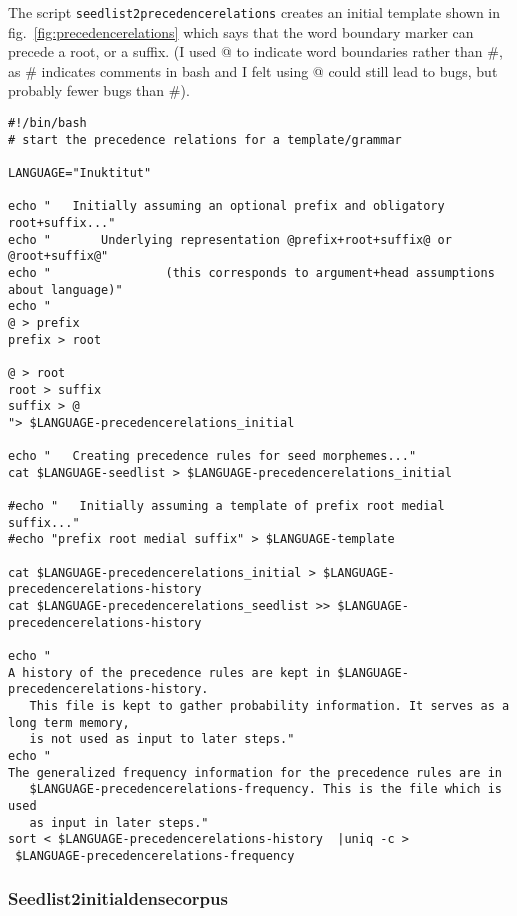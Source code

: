 \documentclass[runningheads,a4paper]{llncs}
\begin{document}
The script {\tt seedlist2precedencerelations} creates an initial template shown in fig.~\ref{fig:precedencerelations} which says that the word boundary marker can precede a root, or a suffix. (I used @ to indicate word boundaries rather than \#, as \# indicates comments in bash and I felt using @ could still lead to bugs, but probably fewer bugs than \#). 

\begin{figure*}[p]
\begin{verbatim}
#!/bin/bash
# start the precedence relations for a template/grammar

LANGUAGE="Inuktitut"

echo "   Initially assuming an optional prefix and obligatory root+suffix..."
echo "       Underlying representation @prefix+root+suffix@ or @root+suffix@"
echo "                (this corresponds to argument+head assumptions about language)"
echo "
@ > prefix
prefix > root

@ > root
root > suffix
suffix > @
"> $LANGUAGE-precedencerelations_initial

echo "   Creating precedence rules for seed morphemes..."
cat $LANGUAGE-seedlist > $LANGUAGE-precedencerelations_initial

#echo "   Initially assuming a template of prefix root medial suffix..."
#echo "prefix root medial suffix" > $LANGUAGE-template

cat $LANGUAGE-precedencerelations_initial > $LANGUAGE-precedencerelations-history
cat $LANGUAGE-precedencerelations_seedlist >> $LANGUAGE-precedencerelations-history

echo "
A history of the precedence rules are kept in $LANGUAGE-precedencerelations-history. 
   This file is kept to gather probability information. It serves as a long term memory, 
   is not used as input to later steps."
echo "
The generalized frequency information for the precedence rules are in 
   $LANGUAGE-precedencerelations-frequency. This is the file which is used 
   as input in later steps."
sort < $LANGUAGE-precedencerelations-history  |uniq -c >
 $LANGUAGE-precedencerelations-frequency
\end{verbatim}
	\caption{Precedence relations are initialized to allow root+suffix, and prefix+root+suffix. }
	\label{fig:precedencerelations}
\end{figure*}

\subsubsection{Seedlist2initialdensecorpus}
\end{document}
